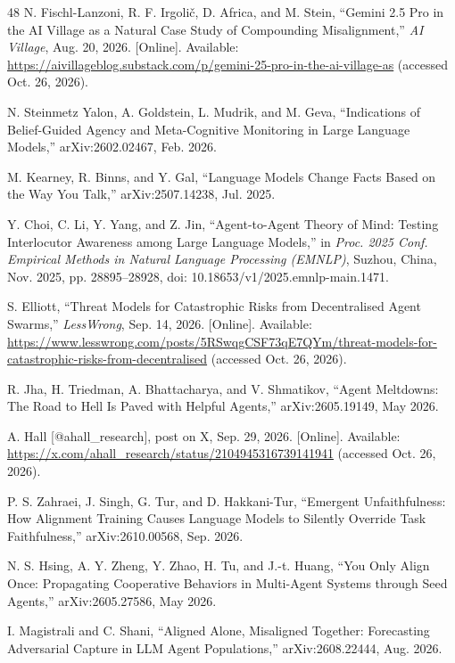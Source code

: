 \begin{thebibliography}{48}
 N. Fischl-Lanzoni, R. F. Irgoli\v{c}, D. Africa, and M. Stein, ``Gemini 2.5 Pro in the
AI Village as a Natural Case Study of Compounding Misalignment,'' \textit{AI Village}, Aug. 20, 2026. [Online].
Available: \url{https://aivillageblog.substack.com/p/gemini-25-pro-in-the-ai-village-as} (accessed Oct. 26, 2026).

 N. Steinmetz Yalon, A. Goldstein, L. Mudrik, and M. Geva, ``Indications of
Belief-Guided Agency and Meta-Cognitive Monitoring in Large Language Models,'' arXiv:2602.02467, Feb. 2026.

 M. Kearney, R. Binns, and Y. Gal, ``Language Models Change Facts Based on the Way You
Talk,'' arXiv:2507.14238, Jul. 2025.

 Y. Choi, C. Li, Y. Yang, and Z. Jin, ``Agent-to-Agent Theory of Mind: Testing Interlocutor
Awareness among Large Language Models,'' in \textit{Proc. 2025 Conf. Empirical Methods in Natural Language
Processing (EMNLP)}, Suzhou, China, Nov. 2025, pp. 28895--28928, doi: 10.18653/v1/2025.emnlp-main.1471.

 S. Elliott, ``Threat Models for Catastrophic Risks from Decentralised Agent Swarms,''
\textit{LessWrong}, Sep. 14, 2026. [Online]. Available:
\url{https://www.lesswrong.com/posts/5RSwqgCSF73qE7QYm/threat-models-for-catastrophic-risks-from-decentralised}
(accessed Oct. 26, 2026).

 R. Jha, H. Triedman, A. Bhattacharya, and V. Shmatikov, ``Agent Meltdowns: The Road to
Hell Is Paved with Helpful Agents,'' arXiv:2605.19149, May 2026.

 A. Hall [@ahall\_research], post on X, Sep. 29, 2026. [Online].
Available: \url{https://x.com/ahall_research/status/2104945316739141941} (accessed Oct. 26, 2026).

 P. S. Zahraei, J. Singh, G. Tur, and D. Hakkani-Tur, ``Emergent
Unfaithfulness: How Alignment Training Causes Language Models to Silently Override Task Faithfulness,''
arXiv:2610.00568, Sep. 2026.

 N. S. Hsing, A. Y. Zheng, Y. Zhao, H. Tu, and J.-t. Huang, ``You Only Align Once: Propagating
Cooperative Behaviors in Multi-Agent Systems through Seed Agents,'' arXiv:2605.27586, May 2026.

 I. Magistrali and C. Shani, ``Aligned Alone, Misaligned Together: Forecasting
Adversarial Capture in LLM Agent Populations,'' arXiv:2608.22444, Aug. 2026.


\end{thebibliography}

